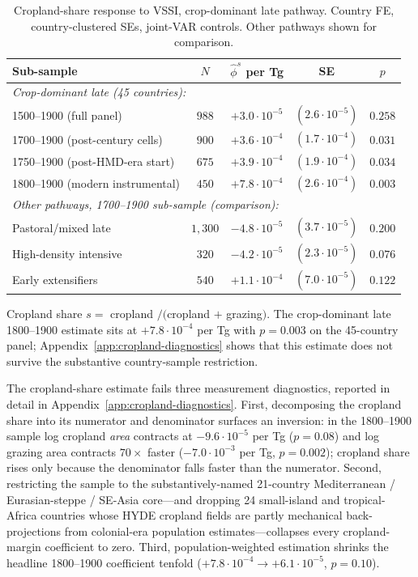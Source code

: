 \documentclass[11pt,letterpaper]{article}
\begin{document}
\begin{table}[H]
\centering
\caption{Cropland-share response to VSSI, crop-dominant late pathway. Country FE, country-clustered SEs, joint-VAR controls. Other pathways shown for comparison.}
\label{tab:boserup-subsamples}
\small
\begin{tabular}{lcccc}
\toprule
Sub-sample & $N$ & $\hat\phi^s$ per Tg & SE & $p$ \\
\midrule
\multicolumn{5}{l}{\textit{Crop-dominant late (45 countries):}} \\
1500--1900 (full panel)              & $988$ & $+3.0\!\cdot\!10^{-5}$ & $(2.6\!\cdot\!10^{-5})$ & $0.258$ \\
1700--1900 (post-century cells)      & $900$ & $+3.6\!\cdot\!10^{-4}$ & $(1.7\!\cdot\!10^{-4})$ & $0.031$ \\
1750--1900 (post-HMD-era start)      & $675$ & $+3.9\!\cdot\!10^{-4}$ & $(1.9\!\cdot\!10^{-4})$ & $0.034$ \\
1800--1900 (modern instrumental)     & $450$ & $+7.8\!\cdot\!10^{-4}$ & $(2.6\!\cdot\!10^{-4})$ & $0.003$ \\
\midrule
\multicolumn{5}{l}{\textit{Other pathways, 1700--1900 sub-sample (comparison):}} \\
Pastoral/mixed late                  & $1{,}300$ & $-4.8\!\cdot\!10^{-5}$ & $(3.7\!\cdot\!10^{-5})$ & $0.200$ \\
High-density intensive               & $320$ & $-4.2\!\cdot\!10^{-5}$ & $(2.3\!\cdot\!10^{-5})$ & $0.076$ \\
Early extensifiers                   & $540$ & $+1.1\!\cdot\!10^{-4}$ & $(7.0\!\cdot\!10^{-5})$ & $0.122$ \\
\bottomrule
\end{tabular}
\par\smallskip\footnotesize{Cropland share $s = $ cropland $/ ($cropland $+$ grazing$)$. The crop-dominant late 1800--1900 estimate sits at $+7.8\!\cdot\!10^{-4}$ per Tg with $p=0.003$ on the 45-country panel; Appendix~\ref{app:cropland-diagnostics} shows that this estimate does not survive the substantive country-sample restriction.}
\end{table}

The cropland-share estimate fails three measurement diagnostics, reported in detail in Appendix~\ref{app:cropland-diagnostics}. First, decomposing the cropland share into its numerator and denominator surfaces an inversion: in the 1800--1900 sample log cropland \emph{area} contracts at $-9.6\!\cdot\!10^{-5}$ per Tg ($p=0.08$) and log grazing area contracts $70\times$ faster ($-7.0\!\cdot\!10^{-3}$ per Tg, $p=0.002$); cropland share rises only because the denominator falls faster than the numerator. Second, restricting the sample to the substantively-named 21-country Mediterranean / Eurasian-steppe / SE-Asia core---and dropping 24 small-island and tropical-Africa countries whose HYDE cropland fields are partly mechanical back-projections from colonial-era population estimates---collapses every cropland-margin coefficient to zero. Third, population-weighted estimation shrinks the headline 1800--1900 coefficient tenfold ($+7.8\!\cdot\!10^{-4}\to+6.1\!\cdot\!10^{-5}$, $p=0.10$).
\end{document}
